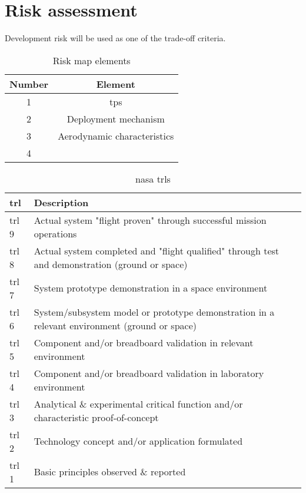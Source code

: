 \section{Risk assessment}
\label{ch:riskestimation}
Development risk will be used as one of the trade-off criteria. 

\begin{table}[h]
	\centering
	\caption{Risk map elements}
	\label{tab:riskmapelements}
	\begin{tabular}{|c|c|}
		\hline 
		\textbf{Number} & \textbf{Element} \\ \hline \hline
		1 & \acrlong{tps} \\
		2 & Deployment mechanism \\
		3 & Aerodynamic characteristics \\
		4 & \\
		\hline
	\end{tabular}
\end{table}

\begin{table}
	\caption[\acrlong{nasa} ]{\gls{nasa} \glspl{trl} \cite{NASA2007}}
	\begin{tabular}{|p{}|p{}|}
		\hline
		\textbf{\acrfull{trl}} & \textbf{Description} \\ \hline \hline
		\gls{trl} 9& Actual system "flight proven" through successful mission operations\\
		\gls{trl} 8& Actual system completed and "flight qualified" through test and demonstration (ground or space)\\
		\gls{trl} 7& System prototype demonstration in a space environment\\
		\gls{trl} 6& System/subsystem model or prototype demonstration in a relevant environment (ground or space)\\
		\gls{trl} 5& Component and/or breadboard validation in relevant environment\\
		\gls{trl} 4& Component and/or breadboard validation in laboratory environment\\
		\gls{trl} 3& Analytical \& experimental critical function and/or characteristic proof-of-concept\\
		\gls{trl} 2& Technology concept and/or application formulated\\
		\gls{trl} 1& Basic principles observed \& reported \\
		\hline
	\end{tabular}
\end{table}

